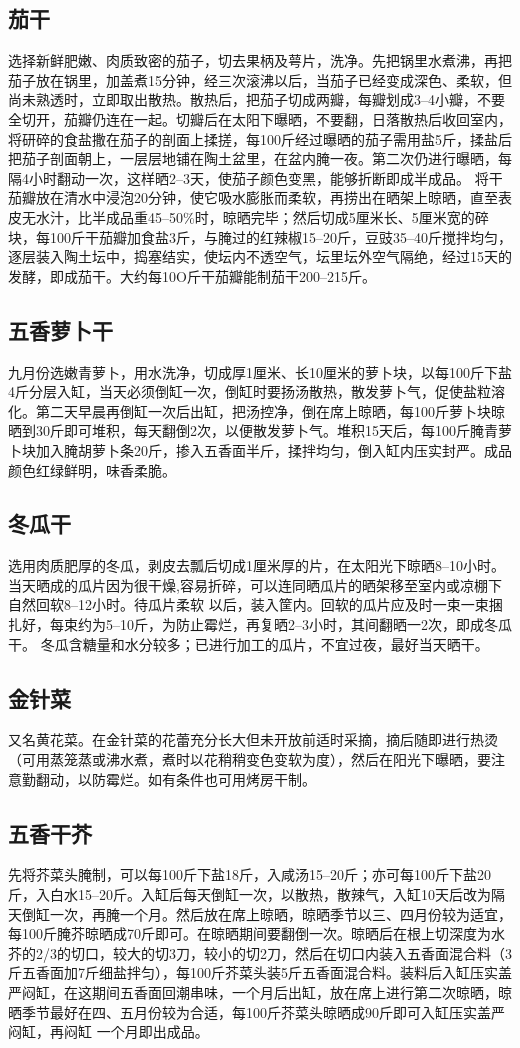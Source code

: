 \documentclass{ctexbook}
\begin{document}
\subsection{茄干}
选择新鲜肥嫩、肉质致密的茄子，切去果柄及萼片，洗净。先把锅里水煮沸，再把茄子放在锅里，加盖煮15分钟，经三次滚沸以后，当茄子已经变成深色、柔软，但尚未熟透时，立即取出散热。散热后，把茄子切成两瓣，每瓣划成3--4小瓣，不要全切开，茄瓣仍连在一起。切瓣后在太阳下曝晒，不要翻，日落散热后收回室内，将研碎的食盐撒在茄子的剖面上揉搓，每100斤经过曝晒的茄子需用盐5斤，揉盐后把茄子剖面朝上，一层层地铺在陶土盆里，在盆内腌一夜。第二次仍进行曝晒，每隔4小时翻动一次，这样晒2--3天，使茄子颜色变黑，能够折断即成半成品。
将干茄瓣放在清水中浸泡20分钟，使它吸水膨胀而柔软，再捞出在晒架上晾晒，直至表皮无水汁，比半成品重45--50\%时，晾晒完毕；然后切成5厘米长、5厘米宽的碎块，每100斤干茄瓣加食盐3斤，与腌过的红辣椒15--20斤，豆豉35--40斤搅拌均匀，逐层装入陶土坛中，捣塞结实，使坛内不透空气，坛里坛外空气隔绝，经过15天的发酵，即成茄干。大约每10O斤干茄瓣能制茄干200--215斤。
\subsection{五香萝卜干}
九月份选嫩青萝卜，用水洗净，切成厚1厘米、长10厘米的萝卜块，以每100斤下盐4斤分层入缸，当天必须倒缸一次，倒缸时要扬汤散热，散发萝卜气，促使盐粒溶化。第二天早晨再倒缸一次后出缸，把汤控净，倒在席上晾晒，每100斤萝卜块晾晒到30斤即可堆积，每天翻倒2次，以便散发萝卜气。堆积15天后，每100斤腌青萝卜块加入腌胡萝卜条20斤，掺入五香面半斤，揉拌均匀，倒入缸内压实封严。成品颜色红绿鲜明，味香柔脆。
\subsection{冬瓜干}
选用肉质肥厚的冬瓜，剥皮去瓢后切成1厘米厚的片，在太阳光下晾晒8--10小时。当天晒成的瓜片因为很干燥,容易折碎，可以连同晒瓜片的晒架移至室内或凉棚下自然回软8--12小时。待瓜片柔软
以后，装入筐内。回软的瓜片应及时一束一束捆扎好，每束约为5--10斤，为防止霉烂，再复晒2--3小时，其间翻晒一2次，即成冬瓜干。
冬瓜含糖量和水分较多；已进行加工的瓜片，不宜过夜，最好当天晒干。
\subsection{金针菜}
又名黄花菜。在金针菜的花蕾充分长大但未开放前适时采摘，摘后随即进行热烫（可用蒸笼蒸或沸水煮，煮时以花稍稍变色变软为度），然后在阳光下曝晒，要注意勤翻动，以防霉烂。如有条件也可用烤房干制。
\subsection{五香干芥}
先将芥菜头腌制，可以每100斤下盐18斤，入咸汤15--20斤；亦可每100斤下盐20斤，入白水15--20斤。入缸后每天倒缸一次，以散热，散辣气，入缸10天后改为隔天倒缸一次，再腌一个月。然后放在席上晾晒，晾晒季节以三、四月份较为适宜，每100斤腌芥晾晒成70斤即可。在晾晒期间要翻倒一次。晾晒后在根上切深度为水芥的2/3的切口，较大的切3刀，较小的切2刀，然后在切口内装入五香面混合料（3斤五香面加7斤细盐拌匀），每100斤芥菜头装5斤五香面混合料。装料后入缸压实盖严闷缸，在这期间五香面回潮串味，一个月后出缸，放在席上进行第二次晾晒，晾晒季节最好在四、五月份较为合适，每100斤芥菜头晾晒成90斤即可入缸压实盖严闷缸，再闷缸
一个月即出成品。
\end{document}
